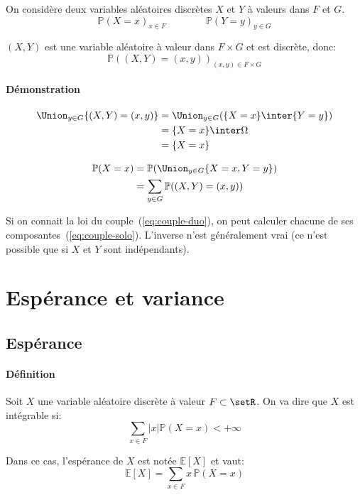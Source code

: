 \documentclass[a4paper,10pt,french,openany]{memoir}
\newcommand{\Proba}{\mathbb{P}}
\newcommand{\Esper}{\mathbb{E}}
\begin{document}
On considère deux variables aléatoires discrètes $X$ et $Y$ à valeurs dans $F$ et $G$.
\begin{equation} \Proba(X=x)_{x\in F} \qquad\qquad \Proba(Y=y)_{y\in G} \label{eq:couple-solo}\end{equation}

$(X,Y)$ est une variable aléatoire à valeur dans $F \times G$ et est discrète, donc:
\begin{equation} \Proba((X,Y)=(x,y))_{(x,y) \in F \times G} \label{eq:couple-duo}\end{equation}

\paragraph{Démonstration}
\begin{align*}
 \Union_{y\in G} \{(X,Y)=(x,y)\} &= \Union_{y\in G} (\{X=x\}\inter\{Y=y\})\\
    &= \{X=x\}\inter \Omega\\
    &= \{X=x\}
\end{align*}

\begin{align*}
 \Proba(X=x) &= \Proba(\Union_{y\in G} \{X=x,Y=y\}) \\
    &= \sum_{y\in G} \Proba((X,Y)=(x,y))
\end{align*}

Si on connait la loi du couple~(\ref{eq:couple-duo}), on peut calculer chacune de ses composantes~(\ref{eq:couple-solo}). L'inverse n'est généralement vrai (ce n'est possible que si $X$ et $Y$ sont indépendants).

\section{Espérance et variance}

\subsection{Espérance}

\paragraph{Définition}
Soit $X$ une variable aléatoire discrète à valeur $F\subset \setR$. On va dire que $X$ est intégrable si:
\[\sum_{x\in F} \lvert x \rvert \Proba(X=x) < +\infty \]

Dans ce cas, l'espérance de $X$ est notée $\Esper[X]$ et vaut:
\[ \Esper[X]=\sum_{x\in F} x\, \Proba(X=x) \]
\end{document}
